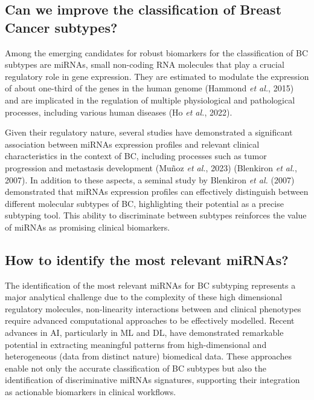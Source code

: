 \subsection{Can we improve the classification of Breast Cancer subtypes?}
Among the emerging candidates for robust biomarkers for the classification of  \gls{BC} subtypes are \gls{miRNAs}, 
small non-coding RNA molecules that play a crucial regulatory role in gene expression. They are estimated to 
modulate the expression of about one-third of the genes in the human genome \cite{mirna_importance_Hammond2015An} 
(Hammond \textit{et al.}, 2015) and are implicated in the regulation of multiple physiological and pathological 
processes, including various human diseases \cite{mirna_as_biomarkers_Ho2022} (Ho \textit{et al.}, 2022).

Given their regulatory nature, several studies have demonstrated a significant association between \gls{miRNAs} expression 
profiles and relevant clinical characteristics in the context of \gls{BC}, including processes such as tumor 
progression and metastasis development \cite{mirna_as_biomarkers_Ho2022} \cite{mirnas_in_bc_Muñoz2023} (Muñoz \textit{et al.}, 2023) \cite{mirna_as_bio_for_sub_Blenkiron2007MicroRNA} (Blenkiron \textit{et al.}, 2007). 
In addition to these aspects, a seminal 
study by Blenkiron \textit{et al.} (2007) demonstrated that \gls{miRNAs} expression profiles can effectively distinguish between 
different molecular subtypes of \gls{BC}, highlighting their potential as a precise subtyping tool. This ability to 
discriminate between subtypes reinforces the value of \gls{miRNAs} as promising clinical biomarkers.

\subsection{How to identify the most relevant miRNAs?}

The identification of the most relevant \gls{miRNAs} for \gls{BC} subtyping represents a major analytical challenge due 
to the complexity of these high dimensional regulatory molecules, non-linearity interactions between and 
clinical phenotypes require advanced computational approaches to be effectively modelled. Recent advances in \gls{AI}, 
particularly in \gls{ML} and \gls{DL}, have demonstrated remarkable potential in extracting meaningful patterns from 
high-dimensional and heterogeneous (data from distinct nature) biomedical data. These approaches enable not only the 
accurate classification of \gls{BC} subtypes but also the identification of discriminative \gls{miRNAs} signatures, 
supporting their integration as actionable biomarkers in clinical workflows.

